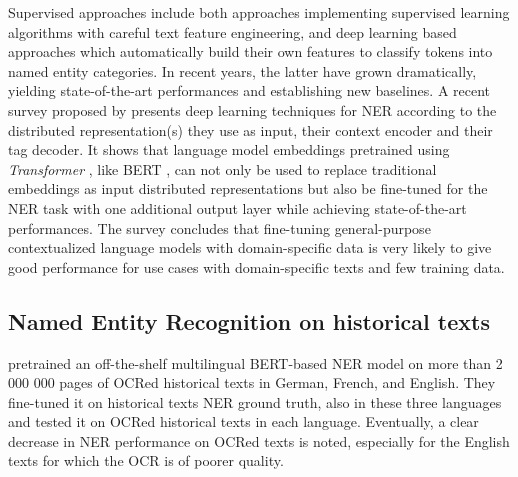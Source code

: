 Supervised approaches include both approaches implementing supervised learning algorithms with careful text feature engineering, and deep learning based approaches which automatically build their own features to classify tokens into named entity categories.
In recent years, the latter have grown dramatically, yielding state-of-the-art performances and establishing new baselines\cite{li2020}.
A recent survey proposed by \cite{li2020} presents deep learning techniques for NER according to the distributed representation(s) they use as input, their context encoder and their tag decoder.
It shows that language model embeddings pretrained using \textit{Transformer} \cite{vaswani2017attention}, like BERT \cite{devlin2018bert}, can not only be used to replace traditional embeddings as input distributed representations but also be fine-tuned for the NER task with one additional output layer while achieving state-of-the-art performances.
The survey concludes that fine-tuning general-purpose contextualized language models with domain-specific data is very likely to give good performance for use cases with domain-specific texts and few training data.

\subsection{Named Entity Recognition on historical texts}
\label{subsection:stoa-ner-on-historical-texts}
\cite{Labusch2020NamedED} pretrained an off-the-shelf multilingual BERT-based NER model on more than 2 000 000 pages of OCRed historical texts in German, French, and English. They fine-tuned it on historical texts NER ground truth, also in these three languages and tested it on OCRed historical texts in each language.
Eventually, a clear decrease in NER performance on OCRed texts is noted, especially for the English texts for which the OCR is of poorer quality. 

